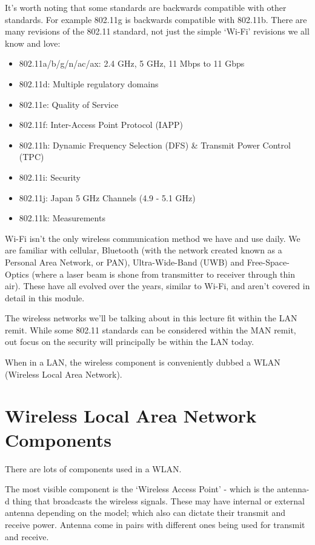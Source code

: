 It's worth noting that some standards are backwards compatible with other standards. For example 802.11g is backwards compatible with 802.11b. There are many revisions of the 802.11 standard, not just the simple `Wi-Fi' revisions we all know and love:
\begin{itemize}
    \item 802.11a/b/g/n/ac/ax: 2.4 GHz, 5 GHz, 11 Mbps to 11 Gbps
    \item 802.11d: Multiple regulatory domains
    \item 802.11e: Quality of Service
    \item 802.11f: Inter-Access Point Protocol (IAPP)
    \item 802.11h: Dynamic Frequency Selection (DFS) \& Transmit Power Control (TPC)
    \item 802.11i: Security
    \item 802.11j: Japan 5 GHz Channels (4.9 - 5.1 GHz)
    \item 802.11k: Measurements
\end{itemize}

Wi-Fi isn't the only wireless communication method we have and use daily. We are familiar with cellular, Bluetooth (with the network created known as a Personal Area Network, or PAN), Ultra-Wide-Band (UWB) and Free-Space-Optics (where a laser beam is shone from transmitter to receiver through thin air). These have all evolved over the years, similar to Wi-Fi, and aren't covered in detail in this module. 

The wireless networks we'll be talking about in this lecture fit within the LAN remit. While some 802.11 standards can be considered within the MAN remit, out focus on the security will principally be within the LAN today. 

When in a LAN, the wireless component is conveniently dubbed a WLAN (Wireless Local Area Network). 

\section{Wireless Local Area Network Components}
There are lots of components used in a WLAN. 

The most visible component is the `Wireless Access Point' - which is the antenna-d thing that broadcasts the wireless signals. These may have internal or external antenna depending on the model; which also can dictate their transmit and receive power. Antenna come in pairs with different ones being used for transmit and receive. 

